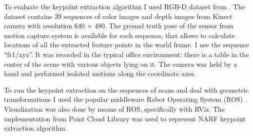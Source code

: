 To evaluate the keypoint extraction algorithm I used RGB-D dataset from \cite{endres2012evaluation}. The dataset contains 39 sequences of color images and depth images from Kinect camera with resolution 640 $\times$ 480. The ground truth pose of the sensor from motion capture system is available for each sequence, that allows to calculate locations of all the extracted feature points in the world frame. I use the sequence ``fr1/xyz''. It was recorded in the typical office environment: there is a table in the center of the scene with various objects lying on it. The camera was held by a hand and performed isolated motions along the coordinate axes.

To run the keypoint extraction on the sequences of scans and deal with geometric transformations I used the popular middleware Robot Operating System (ROS) \cite{ROS2009}. Visualization was also done by means of ROS, specifically with RViz. The implementation from Point Cloud Library \cite{rusu20113d} was used to represent NARF keypoint extraction algorithm.